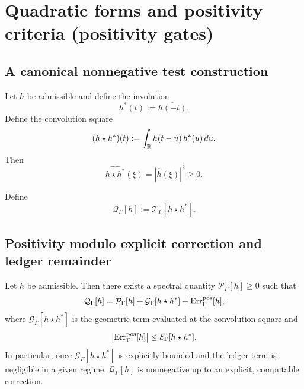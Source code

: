 \section{Quadratic forms and positivity criteria (positivity gates)}
\label{sec:10.positivity}

\subsection{A canonical nonnegative test construction}
\label{subsec:10.pos.conv}

Let $h$ be admissible and define the involution
\[
h^\ast(t):=\overline{h(-t)}.
\]
Define the convolution square
\begin{equation}\label{eq:10.convolution}
(h\star h^\ast)(t):=\int_{\mathbb{R}} h(t-u)\,h^\ast(u)\,du.
\end{equation}
Then
\begin{equation}\label{eq:10.convolution.fourier}
\widehat{h\star h^\ast}(\xi)=|\widehat h(\xi)|^2\ge0.
\end{equation}

\begin{definition}\label{def:10.Qdef}
Define
\begin{equation}\label{eq:10.Q}
\mathcal Q_\Gamma[h]:=\mathcal T_\Gamma[h\star h^\ast].
\end{equation}
\end{definition}

\subsection{Positivity modulo explicit correction and ledger remainder}
\label{subsec:10.pos.gate}

\begin{theorem}\label{thm:10.pos-gate}
Let $h$ be admissible. Then there exists a spectral quantity $\mathcal P_\Gamma[h]\ge0$ such that
\begin{equation}\label{eq:10.posgate}
\mathcal Q_\Gamma[h]
=
\mathcal P_\Gamma[h]
+
\mathcal G_\Gamma[h\star h^\ast]
+
\mathrm{Err}_\Gamma^{\mathrm{pos}}[h],
\end{equation}
where $\mathcal G_\Gamma[h\star h^\ast]$ is the geometric term evaluated at the convolution square and
\begin{equation}\label{eq:10.pos.err}
\big|\mathrm{Err}_\Gamma^{\mathrm{pos}}[h]\big|
\le
\mathcal E_\Gamma[h\star h^\ast].
\end{equation}
In particular, once $\mathcal G_\Gamma[h\star h^\ast]$ is explicitly bounded and the ledger term is negligible in a given regime,
$\mathcal Q_\Gamma[h]$ is nonnegative up to an explicit, computable correction.
\end{theorem}

